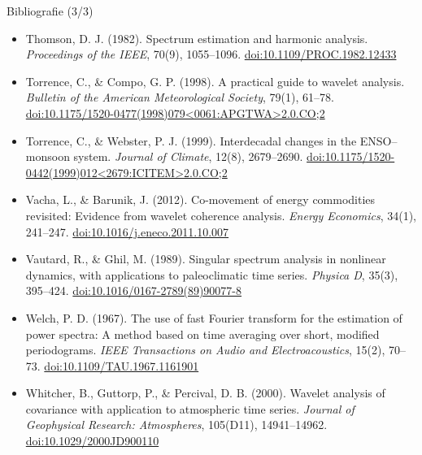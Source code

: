 \begin{frame}{Bibliografie (3/3)}
\begin{itemize}
    \item Thomson, D. J. (1982). Spectrum estimation and harmonic analysis. \textit{Proceedings of the IEEE}, 70(9), 1055--1096. \href{https://doi.org/10.1109/PROC.1982.12433}{doi:10.1109/PROC.1982.12433}
    \item Torrence, C., \& Compo, G. P. (1998). A practical guide to wavelet analysis. \textit{Bulletin of the American Meteorological Society}, 79(1), 61--78. \href{https://doi.org/10.1175/1520-0477(1998)079\%3C0061:APGTWA\%3E2.0.CO;2}{doi:10.1175/1520-0477(1998)079\textless{}0061:APGTWA\textgreater{}2.0.CO;2}
    \item Torrence, C., \& Webster, P. J. (1999). Interdecadal changes in the ENSO--monsoon system. \textit{Journal of Climate}, 12(8), 2679--2690. \href{https://doi.org/10.1175/1520-0442(1999)012\%3C2679:ICITEM\%3E2.0.CO;2}{doi:10.1175/1520-0442(1999)012\textless{}2679:ICITEM\textgreater{}2.0.CO;2}
    \item Vacha, L., \& Barunik, J. (2012). Co-movement of energy commodities revisited: Evidence from wavelet coherence analysis. \textit{Energy Economics}, 34(1), 241--247. \href{https://doi.org/10.1016/j.eneco.2011.10.007}{doi:10.1016/j.eneco.2011.10.007}
    \item Vautard, R., \& Ghil, M. (1989). Singular spectrum analysis in nonlinear dynamics, with applications to paleoclimatic time series. \textit{Physica D}, 35(3), 395--424. \href{https://doi.org/10.1016/0167-2789(89)90077-8}{doi:10.1016/0167-2789(89)90077-8}
    \item Welch, P. D. (1967). The use of fast Fourier transform for the estimation of power spectra: A method based on time averaging over short, modified periodograms. \textit{IEEE Transactions on Audio and Electroacoustics}, 15(2), 70--73. \href{https://doi.org/10.1109/TAU.1967.1161901}{doi:10.1109/TAU.1967.1161901}
    \item Whitcher, B., Guttorp, P., \& Percival, D. B. (2000). Wavelet analysis of covariance with application to atmospheric time series. \textit{Journal of Geophysical Research: Atmospheres}, 105(D11), 14941--14962. \href{https://doi.org/10.1029/2000JD900110}{doi:10.1029/2000JD900110}
\end{itemize}
\end{frame}


